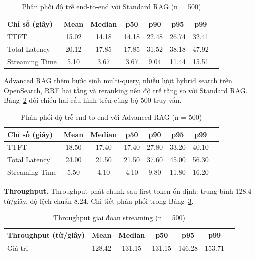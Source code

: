 \begin{table}[H]
\centering
\begin{tabular}{|l|c|c|c|c|c|c|c|}
\hline
\textbf{Chỉ số (giây)} & \textbf{Mean} & \textbf{Median}  & \textbf{p50} & \textbf{p90} & \textbf{p95} & \textbf{p99} \\
\hline
TTFT             & 15.02 & 14.18  & 14.18 & 22.48  & 26.74  & 32.41  \\
\hline
Total Latency    & 20.12 & 17.85  & 17.85 & 31.52  & 38.18  & 47.92  \\
\hline
Streaming Time   & 5.10  & 3.67   & 3.67  & 9.04   & 11.44  & 15.51  \\
\hline
\end{tabular}
\caption{Phân phối độ trễ end-to-end với Standard RAG (n = 500)}
\label{tab:sys_latency_overall}
\end{table}

Advanced RAG thêm bước sinh multi-query, nhiều lượt hybrid search trên OpenSearch, RRF hai tầng và reranking nên độ trễ tăng so với Standard RAG. Bảng~\ref{tab:sys_latency_advanced} đối chiếu hai cấu hình trên cùng bộ 500 truy vấn.

\begin{table}[H]
\centering
\begin{tabular}{|l|c|c|c|c|c|c|c|}
\hline
\textbf{Chỉ số (giây)} & \textbf{Mean} & \textbf{Median} & \textbf{p50} & \textbf{p90} & \textbf{p95} & \textbf{p99} \\
\hline
TTFT             & 18.50 & 17.40  & 17.40 & 27.80  & 33.20  & 40.10  \\
\hline
Total Latency    & 24.00 & 21.50  & 21.50 & 37.60  & 45.00  & 56.30  \\
\hline
Streaming Time   & 5.50  & 4.10   & 4.10  & 9.80   & 11.80  & 16.20  \\
\hline
\end{tabular}
\caption{Phân phối độ trễ end-to-end với Advanced RAG (n = 500)}
\label{tab:sys_latency_advanced}
\end{table}

\textbf{Throughput.}
Throughput phát chunk sau first-token ổn định: trung bình 128.4 từ/giây, độ lệch chuẩn 8.24. Chi tiết phân phối trong Bảng~\ref{tab:sys_throughput}.

\begin{table}[H]
\centering
\begin{tabular}{|l|c|c|c|c|c|c|}
\hline
\textbf{Throughput (từ/giây)} & \textbf{Mean} & \textbf{Median}  & \textbf{p50} & \textbf{p95} & \textbf{p99} \\
\hline
Giá trị & 128.42 & 131.15 & 131.15 & 146.28 & 153.71 \\
\hline
\end{tabular}
\caption{Throughput giai đoạn streaming (n = 500)}
\label{tab:sys_throughput}
\end{table}


